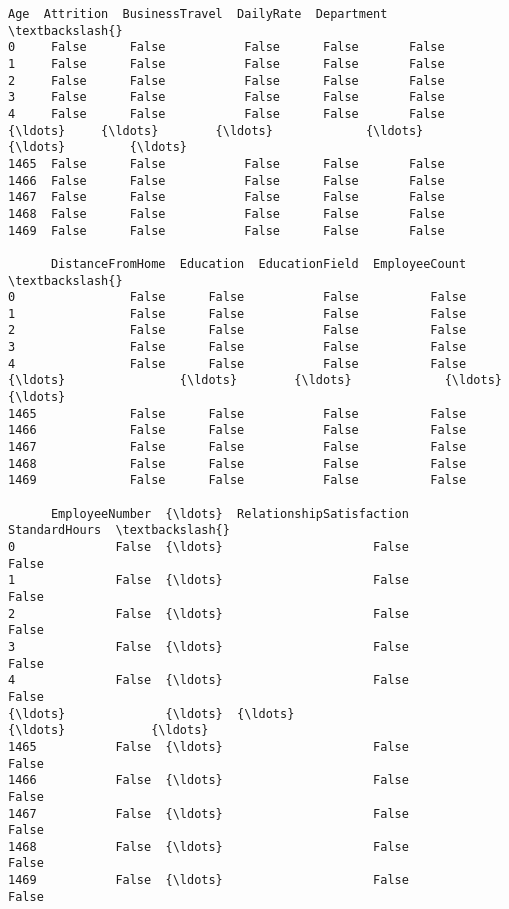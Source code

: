 \documentclass[11pt]{article}
\makeatletter
\newcommand{\boxspacing}{\kern\kvtcb@left@rule\kern\kvtcb@boxsep}
\newcommand{\prompt}[4]{
        {\ttfamily\llap{{\color{#2}[#3]:\hspace{3pt}#4}}\vspace{-\baselineskip}}
    }
\makeatother
\begin{document}
            \begin{tcolorbox}[breakable, size=fbox, boxrule=.5pt, pad at break*=1mm, opacityfill=0]
\prompt{Out}{outcolor}{14}{\boxspacing}
\begin{Verbatim}[commandchars=\\\{\}]
        Age  Attrition  BusinessTravel  DailyRate  Department  \textbackslash{}
0     False      False           False      False       False
1     False      False           False      False       False
2     False      False           False      False       False
3     False      False           False      False       False
4     False      False           False      False       False
{\ldots}     {\ldots}        {\ldots}             {\ldots}        {\ldots}         {\ldots}
1465  False      False           False      False       False
1466  False      False           False      False       False
1467  False      False           False      False       False
1468  False      False           False      False       False
1469  False      False           False      False       False

      DistanceFromHome  Education  EducationField  EmployeeCount  \textbackslash{}
0                False      False           False          False
1                False      False           False          False
2                False      False           False          False
3                False      False           False          False
4                False      False           False          False
{\ldots}                {\ldots}        {\ldots}             {\ldots}            {\ldots}
1465             False      False           False          False
1466             False      False           False          False
1467             False      False           False          False
1468             False      False           False          False
1469             False      False           False          False

      EmployeeNumber  {\ldots}  RelationshipSatisfaction  StandardHours  \textbackslash{}
0              False  {\ldots}                     False          False
1              False  {\ldots}                     False          False
2              False  {\ldots}                     False          False
3              False  {\ldots}                     False          False
4              False  {\ldots}                     False          False
{\ldots}              {\ldots}  {\ldots}                       {\ldots}            {\ldots}
1465           False  {\ldots}                     False          False
1466           False  {\ldots}                     False          False
1467           False  {\ldots}                     False          False
1468           False  {\ldots}                     False          False
1469           False  {\ldots}                     False          False


\end{Verbatim}
\end{tcolorbox}
\end{document}
